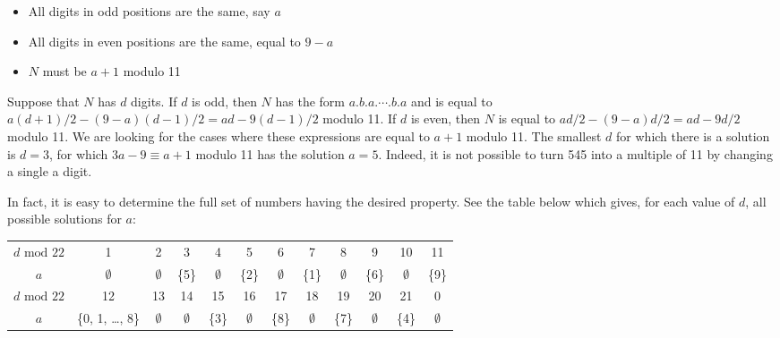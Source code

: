 \documentclass[10pt,a4paper]{article}
\begin{document}
\begin{itemize}
\item{All digits in odd positions are the same, say $a$}
\item{All digits in even positions are the same, equal to $9 - a$}
\item{$N$ must be $a + 1$ modulo 11}
\end{itemize}

Suppose that $N$ has $d$ digits. If $d$ is odd, then $N$ has the form $a.b.a.\cdots.b.a$ and is equal to $a(d+1)/2 - (9-a)(d-1)/2 = ad - 9(d-1)/2$ modulo 11. If $d$ is even, then $N$ is equal to $ad/2 - (9-a)d/2 = ad - 9d/2$ modulo 11. We are looking for the cases where these expressions are equal to $a + 1$ modulo 11. The smallest $d$ for which there is a solution is $d = 3$, for which $3a - 9 \equiv a + 1$ modulo 11 has the solution $a = 5$. Indeed, it is not possible to turn 545 into a multiple of 11 by changing a single a digit.

In fact, it is easy to determine the full set of numbers having the desired property. See the table below which gives, for each value of $d$, all possible solutions for $a$:\\

\begin{tabular}{|c|ccccccccccc|} \hline
$d \mbox{ mod } 22$ & 1 & 2 & 3 & 4 & 5 & 6 & 7 & 8 & 9 & 10 & 11\\
$a$ & $\emptyset$ & $\emptyset$ & \{5\} & $\emptyset$ & \{2\} & $\emptyset$ & \{1\} & $\emptyset$ & \{6\} & $\emptyset$ & \{9\}\\
\hline
$d \mbox{ mod } 22$ & 12 & 13 & 14 & 15 & 16 & 17 & 18 & 19 & 20 & 21 & 0\\
$a$ & \{0, 1, \ldots, 8\} & $\emptyset$ & $\emptyset$ & \{3\} & $\emptyset$ & \{8\} & $\emptyset$ & \{7\} & $\emptyset$ & \{4\} & $\emptyset$\\
\hline
\end{tabular}
\end{document}
